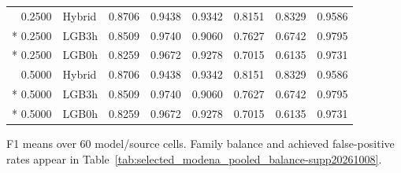 \begin{longtable}{@{}rlrrrrrr@{}}
0.2500 & Hybrid & 0.8706 & 0.9438 & 0.9342 & 0.8151 & 0.8329 & 0.9586 \\*
0.2500 & LGB3h & 0.8509 & 0.9740 & 0.9060 & 0.7627 & 0.6742 & 0.9795 \\*
0.2500 & LGB0h & 0.8259 & 0.9672 & 0.9278 & 0.7015 & 0.6135 & 0.9731 \\
0.5000 & Hybrid & 0.8706 & 0.9438 & 0.9342 & 0.8151 & 0.8329 & 0.9586 \\*
0.5000 & LGB3h & 0.8509 & 0.9740 & 0.9060 & 0.7627 & 0.6742 & 0.9795 \\*
0.5000 & LGB0h & 0.8259 & 0.9672 & 0.9278 & 0.7015 & 0.6135 & 0.9731 \\
\end{longtable}
\noindent\footnotesize F1 means over 60 model/source cells. Family balance and achieved false-positive rates appear in Table~\ref{tab:selected_modena_pooled_balance-supp20261008}.
\par\endgroup

